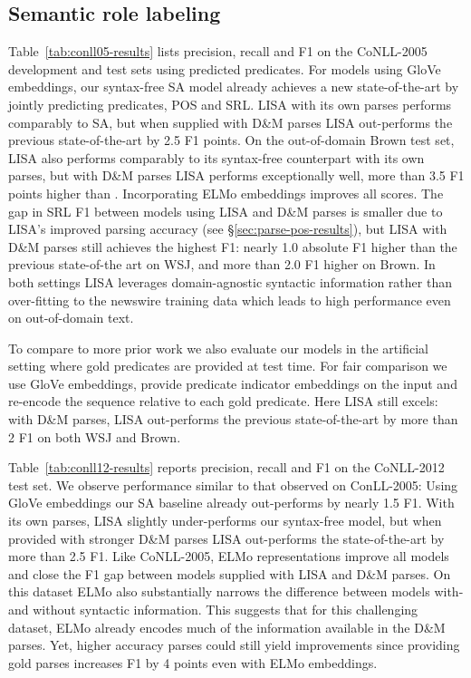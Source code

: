 \documentclass[11pt,a4paper]{article}
\begin{document}
\subsection{Semantic role labeling \label{sec:conll05}}

Table~\ref{tab:conll05-results} lists precision, recall and F1 on the CoNLL-2005 development and test sets using predicted predicates. For models using GloVe embeddings, our syntax-free SA model already achieves a new state-of-the-art by jointly predicting predicates, POS and SRL. LISA with its own parses performs comparably to SA, but when supplied with D\&M parses LISA out-performs the previous state-of-the-art by 2.5 F1 points. On the out-of-domain Brown test set, LISA also performs comparably to its syntax-free counterpart with its own parses, but with D\&M parses LISA performs exceptionally well, more than 3.5 F1 points higher than \citet{he2018jointly}. Incorporating ELMo embeddings improves all scores. The gap in SRL F1 between models using LISA and D\&M parses is smaller due to LISA's improved parsing accuracy (see \S\ref{sec:parse-pos-results}), but LISA with D\&M parses still achieves the highest F1: nearly 1.0 absolute F1 higher than the previous state-of-the art on WSJ, and more than 2.0 F1 higher on Brown. In both settings LISA leverages domain-agnostic syntactic information rather than over-fitting to the newswire training data which leads to high performance even on out-of-domain text.

To compare to more prior work we also evaluate our models in the artificial setting where gold predicates are provided at test time. For fair comparison we use GloVe embeddings, provide predicate indicator embeddings on the input and re-encode the sequence relative to each gold predicate. Here LISA still excels: with D\&M parses, LISA out-performs the previous state-of-the-art by more than 2 F1 on both WSJ and Brown. 

Table~\ref{tab:conll12-results} reports precision, recall and F1 on the CoNLL-2012 test set. We observe performance similar to that observed on ConLL-2005: Using GloVe embeddings our SA baseline already out-performs \citet{he2018jointly} by nearly 1.5 F1. With its own parses, LISA slightly under-performs our syntax-free model, but when provided with stronger D\&M parses LISA out-performs the state-of-the-art by more than 2.5 F1. Like CoNLL-2005, ELMo representations improve all models and close the F1 gap between models supplied with LISA and D\&M parses. On this dataset ELMo also substantially narrows the difference between models with- and without syntactic information. This suggests that for this challenging dataset, ELMo already encodes much of the information available in the D\&M parses. Yet, higher accuracy parses could still yield improvements since providing gold parses increases F1 by 4 points even with ELMo embeddings.
\end{document}
